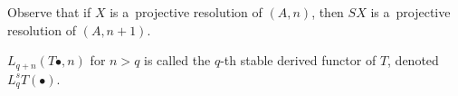     \begin{remark}
     Observe that if $X$ is a~projective resolution of $(A,n)$,
     then $SX$ is a~projective resolution of $(A,n+1)$.
    \end{remark}

    
    \begin{definition}
        $L_{q+n}(T \bullet, n)$ for $n>q$ is called
        the $q$-th stable derived functor of $T$,
        denoted $L_q^s T(\bullet)$.
    \end{definition}


 
 